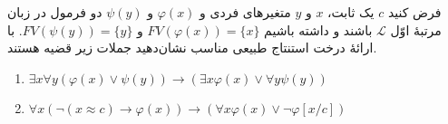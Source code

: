 فرض کنید $c$ یک ثابت، $x$ و $y$ متغیرهای فردی و $\varphi(x)$ و $\psi(y)$ دو فرمول در زبان مرتبهٔ اوّل $\mathcal{L}$ باشند و داشته باشیم $FV(\varphi(x)) = \{x\}$ و $FV(\psi(y)) = \{y\}$.  با ارائهٔ درخت استنتاج طبیعی مناسب نشان‌دهید جملات زیر قضیه هستند.
\begin{enumerate}[label=(\alph*)]
  \item $\exists x \forall y (\varphi(x) \vee \psi(y)) \to (\exists x \varphi(x) \vee \forall y \psi(y))$
  ~
  \item $\forall x (\neg (x \approx c) \to \varphi(x)) \to (\forall x \varphi(x) \vee \neg \varphi[x/c])$
  ~
\end{enumerate}